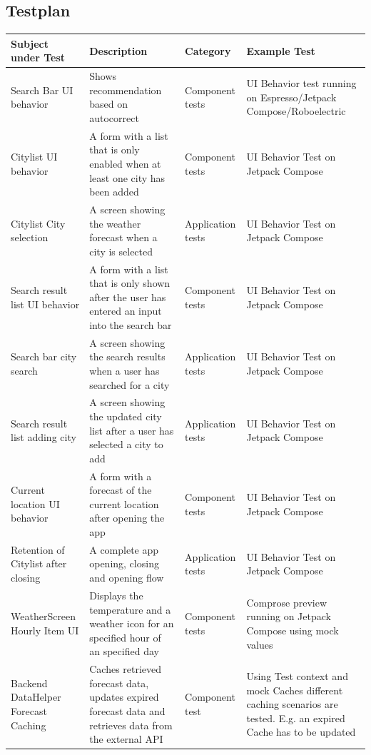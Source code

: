 \documentclass{article}
\begin{document}
\subsection{Testplan}
\begin{center}
  \begin{tabularx}{\textwidth}{| X | X | X | X |}
    \hline
    \textbf{Subject under Test} & \textbf{Description} & \textbf{Category} & \textbf{Example Test} \\
    \hline
    Search Bar UI behavior & Shows recommendation based on autocorrect & Component tests & UI Behavior test running on Espresso/Jetpack Compose/Roboelectric  \\
    \hline
   Citylist UI behavior  & A form with a list that is only enabled when at least one city has been added & Component tests & UI Behavior Test on Jetpack Compose \\
    \hline
    Citylist City selection & A screen showing the weather forecast when a city is selected & Application tests & UI Behavior Test on Jetpack Compose \\
    \hline
    Search result list UI behavior & A form with a list that is only shown after the user has entered an input into the search bar & Component tests & UI Behavior Test on Jetpack Compose  \\
    \hline
    Search bar city search & A screen showing the search results when a user has searched for a city & Application tests & UI Behavior Test on Jetpack Compose \\
    \hline
    Search result list adding city & A screen showing the updated city list after a user has selected a city to add & Application tests & UI Behavior Test on Jetpack Compose \\
    \hline
    Current location UI behavior & A form with a forecast of the current location after opening the app & Component tests & UI Behavior Test on Jetpack Compose \\
    \hline
    Retention of Citylist after closing & A complete app opening, closing and opening flow & Application tests & UI Behavior Test on Jetpack Compose \\
    \hline
    WeatherScreen Hourly Item UI & Displays the temperature and a weather icon for an specified hour of an specified day & Component tests & Comprose preview running on Jetpack Compose using mock values \\
    \hline
    Backend DataHelper Forecast Caching & Caches retrieved forecast data, updates expired forecast data and retrieves data from the external API & Component test & Using Test context and mock Caches different caching scenarios are tested. E.g. an expired Cache has to be updated\\

\end{tabularx}
\end{center}
\end{document}
